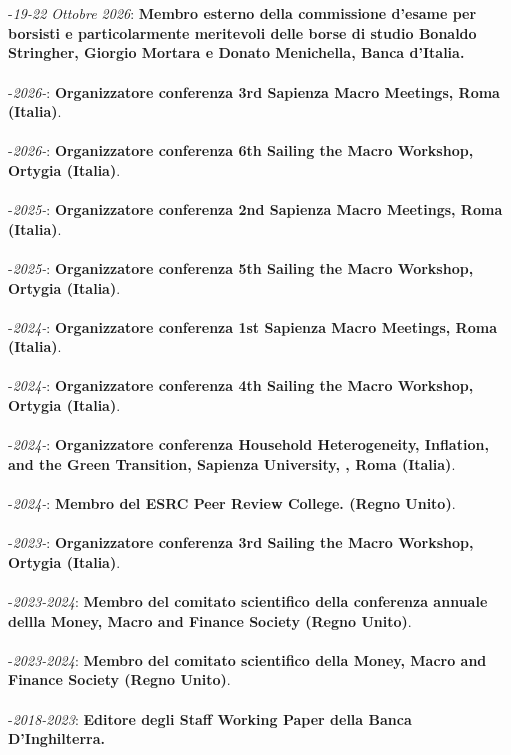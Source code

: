 \documentclass[10p]{article}
\begin{document}
\underline{\hspace{6in}} \\
\\
-\emph{19-22 Ottobre 2026}: {\bf Membro esterno della commissione d'esame per borsisti e particolarmente meritevoli delle borse di studio Bonaldo Stringher, Giorgio Mortara e Donato Menichella, Banca d'Italia.}\\
\\
-\emph{2026-}: {\bf Organizzatore conferenza 3rd Sapienza Macro Meetings, Roma (Italia)}.\\
\\
-\emph{2026-}: {\bf Organizzatore conferenza 6th Sailing the Macro Workshop, Ortygia (Italia)}.\\
\\
-\emph{2025-}: {\bf Organizzatore conferenza 2nd Sapienza Macro Meetings, Roma (Italia)}.\\
\\
-\emph{2025-}: {\bf Organizzatore conferenza 5th Sailing the Macro Workshop, Ortygia (Italia)}.\\
\\
-\emph{2024-}: {\bf Organizzatore conferenza 1st Sapienza Macro Meetings, Roma (Italia)}.\\
\\
-\emph{2024-}: {\bf Organizzatore conferenza 4th Sailing the Macro Workshop, Ortygia (Italia)}.\\
\\
-\emph{2024-}: {\bf Organizzatore conferenza  Household Heterogeneity, Inflation, and the Green Transition, Sapienza University,
, Roma (Italia)}.\\
\\
-\emph{2024-}: {\bf Membro del ESRC Peer Review College. (Regno Unito)}.\\
\\
-\emph{2023-}: {\bf Organizzatore conferenza 3rd Sailing the Macro Workshop, Ortygia (Italia)}.\\
\\
-\emph{2023-2024}: {\bf Membro del comitato scientifico della conferenza annuale dellla Money, Macro and Finance Society (Regno Unito)}.\\
\\
-\emph{2023-2024}: {\bf Membro del comitato scientifico della Money, Macro and Finance Society (Regno Unito)}.\\
\\
-\emph{2018-2023}: {\bf Editore degli Staff Working Paper della Banca D'Inghilterra.}\\
\end{document}
